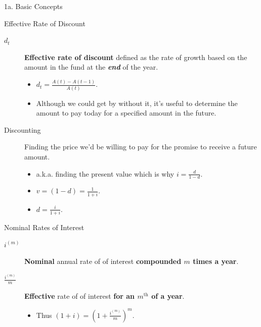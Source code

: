 \begin{CHPT_SUMM_AUTO}[label = {L.-1a}]{1a. Basic Concepts}
\begin{FORMULA_SUMM}{Effective Rate of Discount}
\begin{description}
	\item[$d_{t}$]	\textbf{Effective rate of discount} defined as the rate of growth based on the amount in the fund at the \textbf{\textit{end}} of the year.
		\begin{itemize}[leftmargin = *]
		\item	$d_{t} = \frac{A(t) - A(t - 1)}{A(t)}$.\
		\item	Although we could get by without it, it's useful to determine the amount to pay today for a specified amount in the future.
		\end{itemize}
	\item[Discounting]	Finding the price we'd be willing to pay for the promise to receive a future amount.
		\begin{itemize}[leftmargin = *]
		\item	a.k.a. finding the present value which is why $i = \frac{d}{1 - d}$.
		\item	$v = (1 - d) = \frac{1}{1 + i}$.
		\item	$d = \frac{i}{1 + i}$.
		\end{itemize}
\end{description}
\end{FORMULA_SUMM}

\begin{FORMULA_SUMM}{Nominal Rates of Interest}
\begin{description}
	\item[$i^{(m)}$]	\textbf{Nominal} annual rate of of interest \textbf{compounded $m$ times a year}.
	\item[$\frac{i^{(m)}}{m}$]	\textbf{Effective} rate of of interest \textbf{for an $m^{\text{th}}$ of a year}.
		\begin{itemize}[leftmargin = *]
		\item	Thus $(1 + i) = \left(1 + \frac{i^{(m)}}{m}\right)^{m}$.\
		\end{itemize}
\end{description}
\end{FORMULA_SUMM}
\end{CHPT_SUMM_AUTO}

